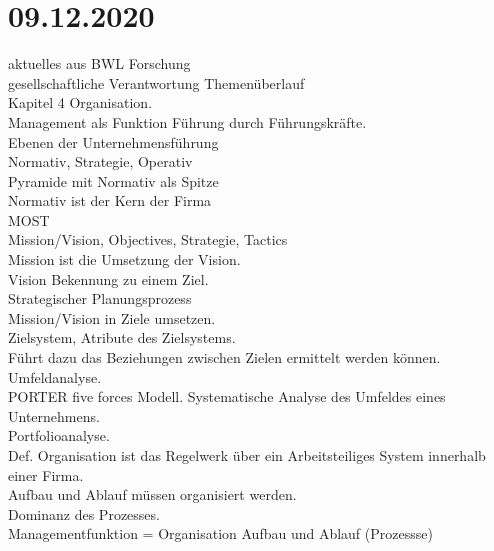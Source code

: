 \documentclass{article}
\begin{document}
	\section*{09.12.2020}
	aktuelles aus BWL Forschung \\
	gesellschaftliche Verantwortung Themenüberlauf \\
	Kapitel 4 Organisation. \\
	Management als Funktion Führung durch Führungskräfte. \\
	Ebenen der Unternehmensführung \\
	Normativ, Strategie, Operativ \\
	Pyramide mit Normativ als Spitze \\
	Normativ ist der Kern der Firma \\
	MOST \\
	Mission/Vision, Objectives, Strategie, Tactics \\
	Mission ist die Umsetzung der Vision. \\
	Vision Bekennung zu einem Ziel. \\
	Strategischer Planungsprozess \\
	Mission/Vision in Ziele umsetzen.  \\
	Zielsystem, Atribute des Zielsystems. \\
	Führt dazu das Beziehungen zwischen Zielen ermittelt werden können. \\
	Umfeldanalyse. \\
	PORTER five forces Modell. Systematische Analyse des Umfeldes eines Unternehmens. \\
	Portfolioanalyse. \\
	Def. Organisation ist das Regelwerk über ein Arbeitsteiliges System innerhalb einer Firma. \\
	Aufbau und Ablauf müssen organisiert werden. \\
	Dominanz des Prozesses. \\
	Managementfunktion = Organisation Aufbau und Ablauf (Prozessse)\\
\end{document}
